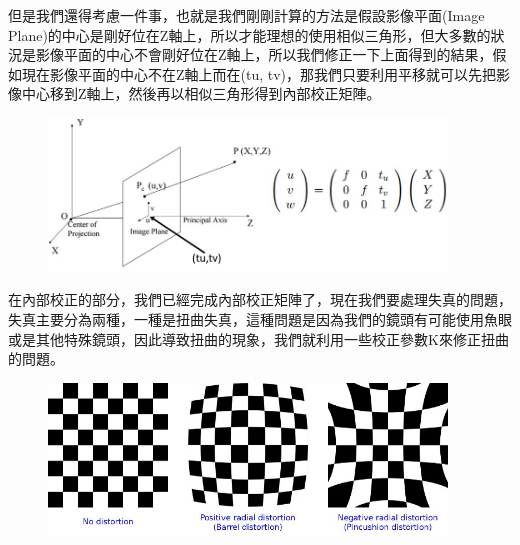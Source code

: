 \documentclass{article}
\begin{document}
但是我們還得考慮一件事，也就是我們剛剛計算的方法是假設影像平面(Image Plane)的中心是剛好位在Z軸上，所以才能理想的使用相似三角形，但大多數的狀況是影像平面的中心不會剛好位在Z軸上，所以我們修正一下上面得到的結果，假如現在影像平面的中心不在Z軸上而在(tu, tv)，那我們只要利用平移就可以先把影像中心移到Z軸上，然後再以相似三角形得到內部校正矩陣。
\\
\begin{figure}[htp]
    \begin{center}
        \includegraphics[width=300pt]{pic/圖片8.jpg}
    \end{center}
\end{figure}

在內部校正的部分，我們已經完成內部校正矩陣了，現在我們要處理失真的問題，失真主要分為兩種，一種是扭曲失真，這種問題是因為我們的鏡頭有可能使用魚眼或是其他特殊鏡頭，因此導致扭曲的現象，我們就利用一些校正參數K來修正扭曲的問題。
\\
\begin{figure}[htp]
    \begin{center}
        \includegraphics[width=300pt]{pic/圖片9.jpg}
    \end{center}
\end{figure}
\end{document}
